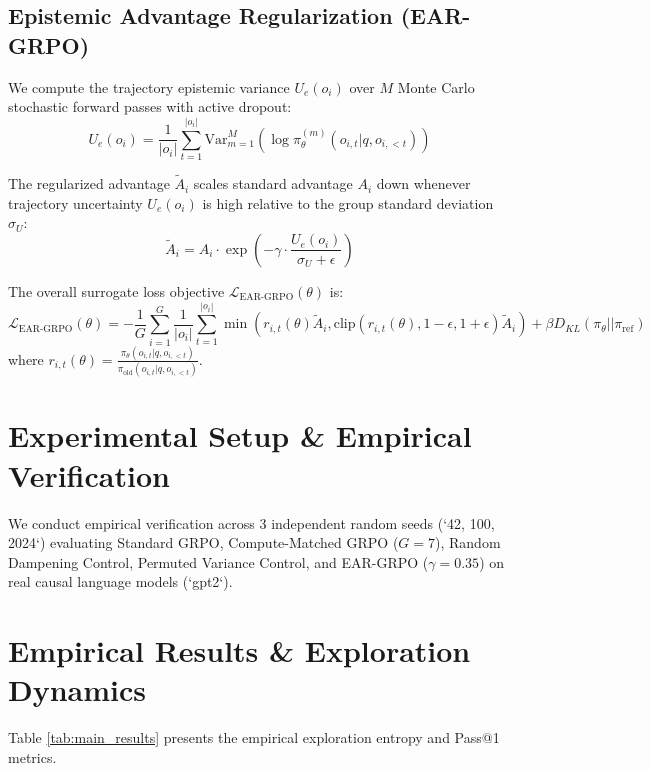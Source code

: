 \documentclass[11pt,a4paper]{article}
\begin{document}
\subsection{Epistemic Advantage Regularization (EAR-GRPO)}
We compute the trajectory epistemic variance $U_e(o_i)$ over $M$ Monte Carlo stochastic forward passes with active dropout:
\begin{equation}
U_e(o_i) = \frac{1}{|o_i|} \sum_{t=1}^{|o_i|} \text{Var}_{m=1}^M \left( \log \pi_\theta^{(m)}(o_{i,t} | q, o_{i,<t}) \right)
\end{equation}

The regularized advantage $\tilde{A}_i$ scales standard advantage $A_i$ down whenever trajectory uncertainty $U_e(o_i)$ is high relative to the group standard deviation $\sigma_U$:
\begin{equation}
\tilde{A}_i = A_i \cdot \exp\left( -\gamma \cdot \frac{U_e(o_i)}{\sigma_U + \epsilon} \right)
\end{equation}

The overall surrogate loss objective $\mathcal{L}_{\text{EAR-GRPO}}(\theta)$ is:
\begin{equation}
\mathcal{L}_{\text{EAR-GRPO}}(\theta) = -\frac{1}{G} \sum_{i=1}^G \frac{1}{|o_i|} \sum_{t=1}^{|o_i|} \min \left( r_{i,t}(\theta) \tilde{A}_i, \text{clip}(r_{i,t}(\theta), 1-\epsilon, 1+\epsilon) \tilde{A}_i \right) + \beta D_{KL}(\pi_\theta || \pi_{\text{ref}})
\end{equation}
where $r_{i,t}(\theta) = \frac{\pi_\theta(o_{i,t} | q, o_{i,<t})}{\pi_{\text{old}}(o_{i,t} | q, o_{i,<t})}$.

\section{Experimental Setup \& Empirical Verification}
We conduct empirical verification across 3 independent random seeds (`42, 100, 2024`) evaluating Standard GRPO, Compute-Matched GRPO ($G=7$), Random Dampening Control, Permuted Variance Control, and EAR-GRPO ($\gamma = 0.35$) on real causal language models (`gpt2`).

\section{Empirical Results \& Exploration Dynamics}
Table \ref{tab:main_results} presents the empirical exploration entropy and Pass@1 metrics.
\end{document}
